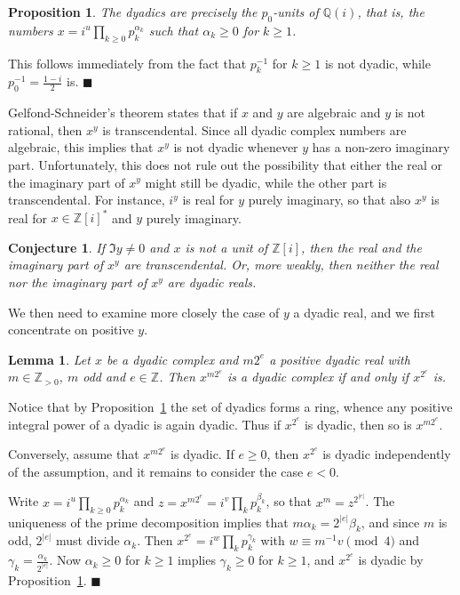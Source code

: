 \documentclass [11pt]{article}
\newcommand {\Z}{\mathbb Z}
\newcommand {\Q}{\mathbb Q}
\renewcommand {\geq}{\geqslant}
\newtheorem{lemma}[theorem]{Lemma}
\newtheorem{prop}[theorem]{Proposition}
\newtheorem{conj}[theorem]{Conjecture}
\newenvironment{proof}{\noindent{\bf Proof:}}{{\hspace* {\fill}$\blacksquare$}}
\begin{document}
\begin {prop}
\label {prop:dyadic}
The dyadics are precisely the $p_0$-units of $\Q (i)$, that is,
the numbers $x = i^u \prod_{k \geq 0} p_k^{\alpha_k}$
such that $\alpha_k \geq 0$ for $k \geq 1$.
\end {prop}

\begin {proof}
This follows immediately from the fact that $p_k^{-1}$ for $k \geq 1$ is not
dyadic, while $p_0^{-1} = \frac {1 - i}{2}$ is.
\end {proof}

Gelfond-Schneider's theorem states that if $x$ and $y$ are algebraic and
$y$ is not rational, then $x^y$ is transcendental.
Since all dyadic complex numbers are algebraic, this implies that $x^y$ is
not dyadic whenever $y$ has a non-zero imaginary part.
Unfortunately, this does not rule out the possibility that
either the real or the imaginary part of $x^y$ might still be dyadic,
while the other part is transcendental.
For instance, $i^y$ is real for $y$ purely imaginary, so that
also $x^y$ is real for $x \in \Z [i]^\ast$ and $y$ purely imaginary.

\begin {conj}
\label{conj}
If $\Im y \neq 0$ and $x$ is not a unit of $\Z [i]$, then
the real and the imaginary part of $x^y$ are transcendental.
Or, more weakly, then neither the real nor the imaginary
part of $x^y$ are dyadic reals.
\end {conj}

We then need to examine more closely the case of $y$ a dyadic real,
and we first concentrate on positive $y$.

\begin{lemma}
\label{lemma1}
Let $x$ be a dyadic complex and $m 2^e$ a positive dyadic real
with $m \in \Z_{>0}$, $m$ odd and $e \in \Z$.
Then $x^{m 2^e}$ is a dyadic complex if and only if $x^{2^e}$ is.
\end{lemma}

\begin{proof}
Notice that by Proposition~\ref {prop:dyadic} the set of dyadics forms
a ring, whence any positive integral power of a dyadic is again dyadic.
Thus if $x^{2^e}$ is dyadic, then so is $x^{m 2^e}$.

Conversely, assume that $x^{m 2^e}$ is dyadic. If $e \geq 0$,
then $x^{2^e}$ is dyadic independently of the assumption,
and it remains to consider the case $e < 0$.

Write $x = i^u \prod_{k \geq 0} p_k^{\alpha_k}$
and $z = x^{m 2^e} = i^v \prod_k p_k^{\beta_k}$, so that $x^m = z^{2^{|e|}}$.
The uniqueness of the prime decomposition implies that
$m \alpha_k = 2^{|e|} \beta_k$, and since $m$ is odd, $2^{|e|}$ must
divide $\alpha_k$. Then
$x^{2^e} = i^w \prod_k p_k^{\gamma_k}$ with $w \equiv m^{-1} v \pmod 4$ and
$\gamma_k = \frac {\alpha_k}{2^{|e|}}$.
Now $\alpha_k \geq 0$ for $k \geq 1$ implies $\gamma_k \geq 0$ for $k \geq 1$,
and $x^{2^e}$ is dyadic by Proposition~\ref {prop:dyadic}.
\end{proof}
\end{document}
